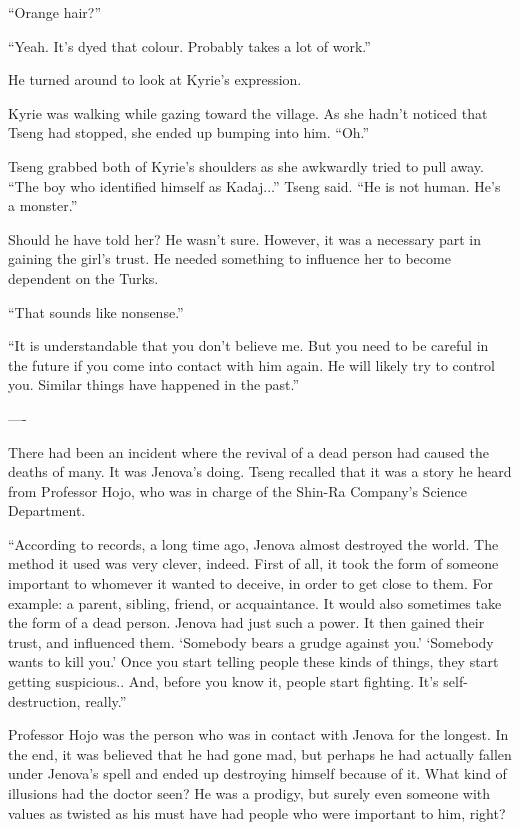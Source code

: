 \documentclass[oneside]{book}
\begin{document}
“Orange hair?”

“Yeah. It’s dyed that colour. Probably takes a lot of work.”

He turned around to look at Kyrie’s expression.

Kyrie was walking while gazing toward the village. As she hadn’t noticed that Tseng had stopped, she ended up bumping into him. “Oh.”

Tseng grabbed both of Kyrie’s shoulders as she awkwardly tried to pull away. “The boy who identified himself as Kadaj...” Tseng said. “He is not human. He’s a monster.”

Should he have told her? He wasn’t sure. However, it was a necessary part in gaining the girl’s trust. He needed something to influence her to become dependent on the Turks.

“That sounds like nonsense.”

“It is understandable that you don’t believe me. But you need to be careful in the future if you come into contact with him again. He will likely try to control you. Similar things have happened in the past.”

—-

There had been an incident where the revival of a dead person had caused the deaths of many. It was Jenova’s doing. Tseng recalled that it was a story he heard from Professor Hojo, who was in charge of the Shin-Ra Company’s Science Department.

“According to records, a long time ago, Jenova almost destroyed the world. The method it used was very clever, indeed. First of all, it took the form of someone important to whomever it wanted to deceive, in order to get close to them. For example: a parent, sibling, friend, or acquaintance. It would also sometimes take the form of a dead person. Jenova had just such a power. It then gained their trust, and influenced them. ‘Somebody bears a grudge against you.’ ‘Somebody wants to kill you.’ Once you start telling people these kinds of things, they start getting suspicious.. And, before you know it, people start fighting. It’s self-destruction, really.”

Professor Hojo was the person who was in contact with Jenova for the longest. In the end, it was believed that he had gone mad, but perhaps he had actually fallen under Jenova’s spell and ended up destroying himself because of it. What kind of illusions had the doctor seen? He was a prodigy, but surely even someone with values as twisted as his must have had people who were important to him, right?
\end{document}
